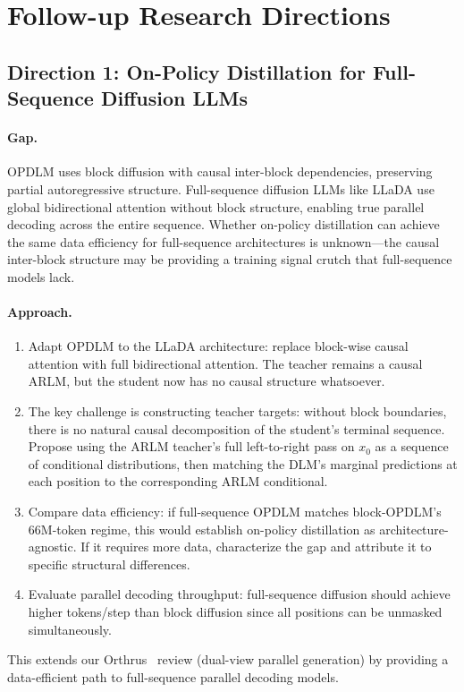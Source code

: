 \documentclass[11pt,a4paper]{article}
\begin{document}
\section{Follow-up Research Directions}

\subsection{Direction 1: On-Policy Distillation for Full-Sequence Diffusion LLMs}

\paragraph{Gap.} OPDLM uses block diffusion with causal inter-block dependencies, preserving partial autoregressive structure. Full-sequence diffusion LLMs like LLaDA use global bidirectional attention without block structure, enabling true parallel decoding across the entire sequence. Whether on-policy distillation can achieve the same data efficiency for full-sequence architectures is unknown---the causal inter-block structure may be providing a training signal crutch that full-sequence models lack.

\paragraph{Approach.}
\begin{enumerate}
\item Adapt OPDLM to the LLaDA architecture: replace block-wise causal attention with full bidirectional attention. The teacher remains a causal ARLM, but the student now has no causal structure whatsoever.
\item The key challenge is constructing teacher targets: without block boundaries, there is no natural causal decomposition of the student's terminal sequence. Propose using the ARLM teacher's full left-to-right pass on $x_0$ as a sequence of conditional distributions, then matching the DLM's marginal predictions at each position to the corresponding ARLM conditional.
\item Compare data efficiency: if full-sequence OPDLM matches block-OPDLM's 66M-token regime, this would establish on-policy distillation as architecture-agnostic. If it requires more data, characterize the gap and attribute it to specific structural differences.
\item Evaluate parallel decoding throughput: full-sequence diffusion should achieve higher tokens/step than block diffusion since all positions can be unmasked simultaneously.
\end{enumerate}
This extends our Orthrus~\cite{orthrus2026} review (dual-view parallel generation) by providing a data-efficient path to full-sequence parallel decoding models.
\end{document}
